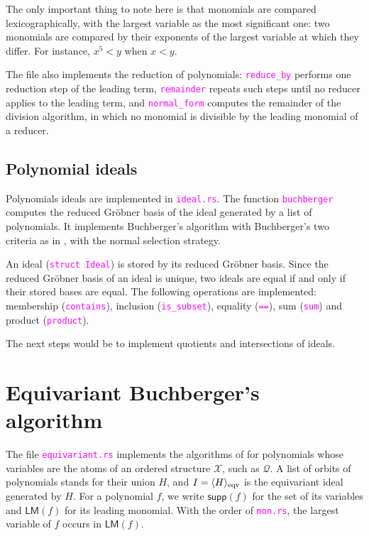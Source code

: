 \documentclass[12pt,a4paper,article]{memoir}
\newcommand{\struct}{\mathcal{X}}
\newcommand{\dloQ}{\mathcal{Q}}
\newcommand{\eqIdGen}[1]{\langle#1\rangle_{\textnormal{eqv}}}
\newcommand{\code}[1]{\texttt{\textcolor{magenta}{#1}}}
\theoremstyle{definition}
\begin{document}
The only important thing to note here is that monomials are compared lexicographically,
with the largest variable as the most significant one:
two monomials are compared by their exponents of the largest variable at which they differ.
For instance, $x^5 < y$ when $x < y$.

The file also implements the reduction of polynomials:
\code{reduce\_by} performs one reduction step of the leading term,
\code{remainder} repeats such steps until no reducer applies to the leading term,
and \code{normal\_form} computes the remainder of the division algorithm,
in which no monomial is divisible by the leading monomial of a reducer.
%
\subsection{Polynomial ideals}
%
Polynomials ideals are implemented in \code{ideal.rs}.
The function \code{buchberger} computes the reduced Gr\"{o}bner basis of the ideal generated by a list of polynomials.
It implements Buchberger's algorithm with Buchberger's two criteria as in \cite[Chapter 2, \S10]{CLO15},
with the normal selection strategy.

An ideal (\code{struct Ideal}) is stored by its reduced Gr\"{o}bner basis.
Since the reduced Gr\"{o}bner basis of an ideal is unique,
two ideals are equal if and only if their stored bases are equal.
The following operations are implemented:
membership (\code{contains}), inclusion (\code{is\_subset}), equality (\code{==}),
sum (\code{sum}) and product (\code{product}).

The next steps would be to implement quotients and intersections of ideals.
%
\section{Equivariant Buchberger's algorithm}\label{sec:eq buchberger}
%
The file \code{equivariant.rs} implements the algorithms of \cite[Sections 4 and 5]{GL25}
for polynomials whose variables are the atoms of an ordered structure $\struct$, such as $\dloQ$.
A list of orbits of polynomials stands for their union $H$,
and $I = \eqIdGen{H}$ is the equivariant ideal generated by $H$.
For a polynomial $f$, we write $\mathsf{supp}(f)$ for the set of its variables
and $\mathsf{LM}(f)$ for its leading monomial.
With the order of \code{mon.rs}, the largest variable of $f$ occurs in $\mathsf{LM}(f)$.
\end{document}
